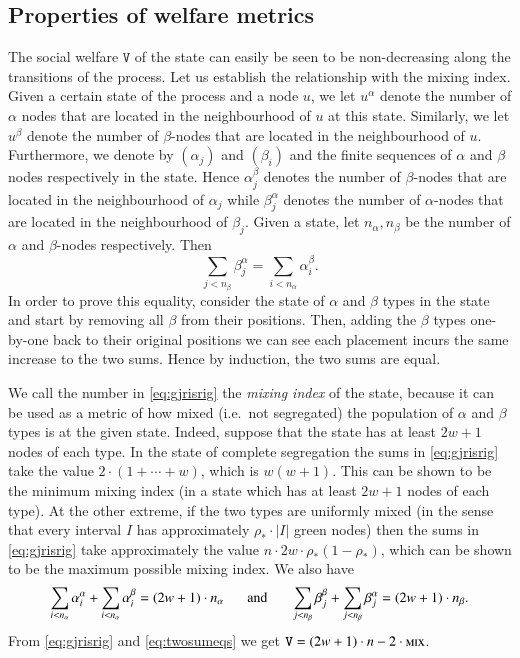 \documentclass[11pt]{article}
\theoremstyle{plain}
\numberwithin{equation}{subsection}
\newcommand{\mix}{\textsc{mix}}
\begin{document}
\subsection{Properties of welfare metrics}\label{subse:welfare}
The social welfare $\texttt{V}$ of the state can easily be seen to be
 non-decreasing along the transitions of the process.
Let us establish the relationship with the mixing index.
Given a certain state of the process and a node $u$, 
we let $u^{\alpha}$
denote the number of $\alpha$ nodes
that are located in the neighbourhood of $u$ at this state. Similarly, we let
$u^{\beta}$ denote the number of $\beta$-nodes
that are located in the neighbourhood of $u$.
Furthermore, we denote by $(\alpha_j)$ and $(\beta_i)$ and  the finite sequences of 
$\alpha$ and $\beta$  nodes respectively in the state. 
Hence $\alpha_j^{\beta}$ denotes the number of $\beta$-nodes
that are located in the neighbourhood of $\alpha_j$ while
$\beta_j^{\alpha}$ denotes the number of $\alpha$-nodes
that are located in the neighbourhood of $\beta_j$. 
Given a state, let $n_{\alpha}, n_{\beta}$ be the number of 
$\alpha$ and $\beta$-nodes respectively. Then
\begin{equation}\label{eq:gjrisrig}
\sum_{j<n_{\beta}} \beta_j^{\alpha} = \sum_{i<n_{\alpha}} \alpha_i^{\beta}.
\end{equation}
In order to prove this equality,
consider the state of $\alpha$ and $\beta$ types in
the state and start by removing all $\beta$ from their positions. Then, adding
the $\beta$ types one-by-one back to their original 
positions we can see each placement
incurs the same increase to the two sums.
Hence by induction, the two sums are equal.

We call the number in \eqref{eq:gjrisrig} the {\em mixing index} of the state,
because it can be used as a metric of how mixed 
(i.e.\ not segregated) the population of $\alpha$ and $\beta$ types
is at the given state. 
Indeed, suppose that the state has at least
$2w+1$ nodes of each type.
In the state of complete segregation  
the sums in \eqref{eq:gjrisrig} take the value $2\cdot (1+\cdots +w)$, which is $w(w+1)$. 
This can be shown to be the minimum mixing index (in a state which has 
at least
$2w+1$ nodes of each type).
At the other extreme, 
if the two types are uniformly mixed (in the sense that
every interval $I$ has approximately $\rho_{\ast} \cdot |I|$ green nodes) then 
the sums in
\eqref{eq:gjrisrig} take approximately the value 
$n\cdot 2w\cdot \rho_{\ast}(1-\rho_{\ast})$, 
which can be shown to be the maximum
possible mixing index.
We also have
\begin{equation}\label{eq:twosumeqs}
\sum_{i<n_{\alpha}} \alpha_i^{\alpha} + 
\sum_{i<n_{\alpha}} \alpha_i^{\beta} = 
(2w+1)\cdot n_{\alpha} \hspace{0.5cm}\textrm{ and }\hspace{0.5cm}
\sum_{j<n_{\beta}} \beta_j^{\beta} + \sum_{j<n_{\beta}} \beta_j^{\alpha} 
= (2w+1)\cdot n_{\beta}.
\end{equation}
From \eqref{eq:gjrisrig}
and \eqref{eq:twosumeqs} we get 
$\mathtt{V}= (2w+1)\cdot n - 2\cdot\mix$.
\end{document}
